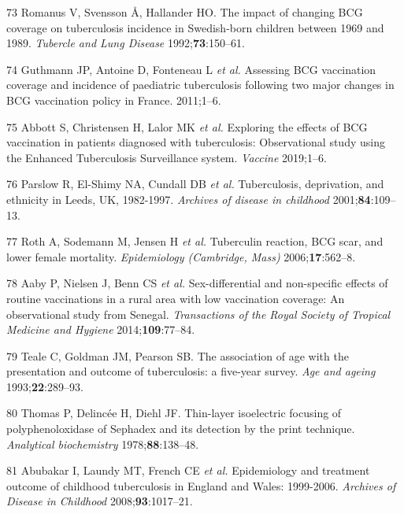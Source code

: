 \documentclass[11pt,twoside]{bristolthesis}
\begin{document}
  \leavevmode\hypertarget{ref-Romanus1992}{}%
  73 Romanus V, Svensson Å, Hallander HO. The impact of changing BCG coverage on tuberculosis incidence in Swedish-born children between 1969 and 1989. \emph{Tubercle and Lung Disease} 1992;\textbf{73}:150--61.
  
  \leavevmode\hypertarget{ref-Guthmann2011}{}%
  74 Guthmann JP, Antoine D, Fonteneau L \emph{et al.} Assessing BCG vaccination coverage and incidence of paediatric tuberculosis following two major changes in BCG vaccination policy in France. 2011;1--6.
  
  \leavevmode\hypertarget{ref-Abbott:2019ir}{}%
  75 Abbott S, Christensen H, Lalor MK \emph{et al.} Exploring the effects of BCG vaccination in patients diagnosed with tuberculosis: Observational study using the Enhanced Tuberculosis Surveillance system. \emph{Vaccine} 2019;1--6.
  
  \leavevmode\hypertarget{ref-Parslow2001}{}%
  76 Parslow R, El-Shimy NA, Cundall DB \emph{et al.} Tuberculosis, deprivation, and ethnicity in Leeds, UK, 1982-1997. \emph{Archives of disease in childhood} 2001;\textbf{84}:109--13.
  
  \leavevmode\hypertarget{ref-Roth2006a}{}%
  77 Roth A, Sodemann M, Jensen H \emph{et al.} Tuberculin reaction, BCG scar, and lower female mortality. \emph{Epidemiology (Cambridge, Mass)} 2006;\textbf{17}:562--8.
  
  \leavevmode\hypertarget{ref-Aaby2014}{}%
  78 Aaby P, Nielsen J, Benn CS \emph{et al.} Sex-differential and non-specific effects of routine vaccinations in a rural area with low vaccination coverage: An observational study from Senegal. \emph{Transactions of the Royal Society of Tropical Medicine and Hygiene} 2014;\textbf{109}:77--84.
  
  \leavevmode\hypertarget{ref-Teale1993}{}%
  79 Teale C, Goldman JM, Pearson SB. The association of age with the presentation and outcome of tuberculosis: a five-year survey. \emph{Age and ageing} 1993;\textbf{22}:289--93.
  
  \leavevmode\hypertarget{ref-DCLG2011}{}%
  80 Thomas P, Delincée H, Diehl JF. Thin-layer isoelectric focusing of polyphenoloxidase of Sephadex and its detection by the print technique. \emph{Analytical biochemistry} 1978;\textbf{88}:138--48.
  
  \leavevmode\hypertarget{ref-Abubakar2008}{}%
  81 Abubakar I, Laundy MT, French CE \emph{et al.} Epidemiology and treatment outcome of childhood tuberculosis in England and Wales: 1999-2006. \emph{Archives of Disease in Childhood} 2008;\textbf{93}:1017--21.
  
\end{document}
